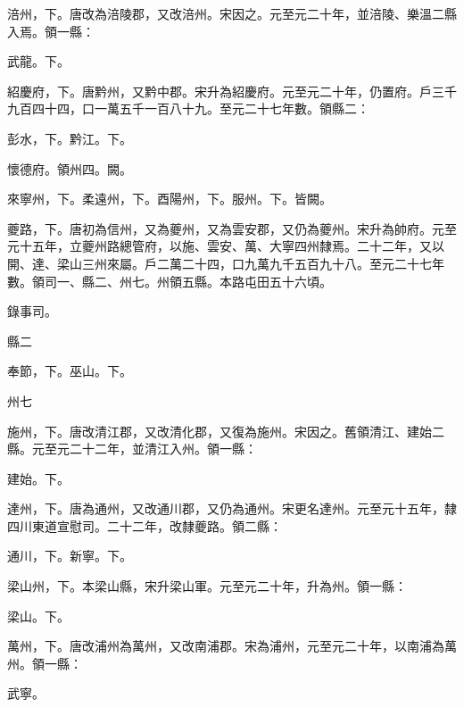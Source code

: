 \begin{pinyinscope}
 涪州，下。唐改為涪陵郡，又改涪州。宋因之。元至元二十年，並涪陵、樂溫二縣入焉。領一縣：



 武龍。下。



 紹慶府，下。唐黔州，又黔中郡。宋升為紹慶府。元至元二十年，仍置府。戶三千九百四十四，口一萬五千一百八十九。至元二十七年數。領縣二：



 彭水，下。黔江。下。



 懷德府。領州四。闕。



 來寧州，下。柔遠州，下。酉陽州，下。服州。下。皆闕。



 夔路，下。唐初為信州，又為夔州，又為雲安郡，又仍為夔州。宋升為帥府。元至元十五年，立夔州路總管府，以施、雲安、萬、大寧四州隸焉。二十二年，又以開、達、梁山三州來屬。戶二萬二十四，口九萬九千五百九十八。至元二十七年數。領司一、縣二、州七。州領五縣。本路屯田五十六頃。



 錄事司。



 縣二



 奉節，下。巫山。下。



 州七



 施州，下。唐改清江郡，又改清化郡，又復為施州。宋因之。舊領清江、建始二縣。元至元二十二年，並清江入州。領一縣：



 建始。下。



 達州，下。唐為通州，又改通川郡，又仍為通州。宋更名達州。元至元十五年，隸四川東道宣慰司。二十二年，改隸夔路。領二縣：



 通川，下。新寧。下。



 梁山州，下。本梁山縣，宋升梁山軍。元至元二十年，升為州。領一縣：



 梁山。下。



 萬州，下。唐改浦州為萬州，又改南浦郡。宋為浦州，元至元二十年，以南浦為萬州。領一縣：



 武寧。




\end{pinyinscope}
